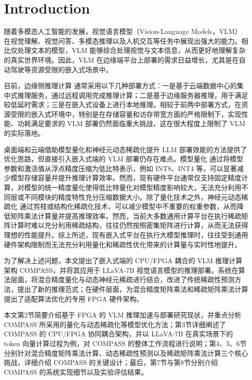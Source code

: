 \documentclass[sigconf]{acmart}
\begin{document}
	\section{Introduction}
	随着多模态人工智能的发展，视觉语言模型（Vision-Language Models，VLM） \cite{VisualLargeLanguageModels} 在视觉理解、视觉问答、多模态推理以及人机交互等任务中展现出强大的能力。相比仅处理文本的模型，VLM 能够综合处理视觉与文本信息，从而更好地理解复杂的真实世界环境。因此，VLM 在边缘端平台上部署的需求日益增长，尤其是在自动驾驶等资源受限的嵌入式场景中。

	目前，边缘侧推理计算 \cite{EdgeComputing} 通常采用以下几种部署方式：一是基于云端数据中心的集中式推理服务，通过远程调用完成推理计算；二是基于边缘服务器推理，用于满足较低延时需求；三是在嵌入式设备上进行本地推理。相较于前两中部署方式，在资源受限的嵌入式环境中，特别是在存储容量和访存带宽方面的严格限制下，实现性能、功耗满足要求的 VLM 部署仍然面临重大挑战，这在很大程度上限制了 VLM 的实际落地。

	桌面端和云端借助模型量化和神经元动态稀疏化提升 LLM 部署效能的方法提供了优化思路，但直接引入嵌入式端的 VLM 部署仍存在难点。模型量化 \cite{MEViT} \cite{QVLM} \cite{Q-VLM} \cite{Swin} \cite{TrackVLA} 通过将模型参数和激活值从浮点精度压缩为低比特表示，例如 INT8、INT4 等，可以显著减少模型存储容量并提升推理计算效率。然而，现有硬件平台通常仅支持固定精度计算，对模型的统一精度量化使得低比特量化对模型精度影响较大，无法充分利用不同层或不同模块的精度特性充分压缩数据大小。除了量化技术之外，神经元动态稀疏化 \cite{DejaVu} \cite{Powerinfer} 通过剪枝或结构化稀疏化技术，可以减少模型中不重要的权重参数，从而降低矩阵乘法计算量并提高推理效率。然而，当前大多数通用计算平台在执行稀疏矩阵计算时难以充分利用稀疏结构，往往仍然按照密集矩阵进行计算，从而无法获得理想的性能提升。综上所述，现有嵌入式平台在执行大模型推理时，往往受到通用硬件架构限制而无法充分利用量化和稀疏性优化带来的计算量与实时性地提升。
	
	为了解决上述问题，本文提出了嵌入式端的 CPU/FPGA 耦合的 VLM 推理计算架构 COMPASS，并将其应用于 LLaVA-7B \cite{Q-VLM} 视觉语言模型的推理部署。系统在算法层面，将混合精度量化与动态神经元稀疏进行结合，改进了传统稀疏性预测方法，提出了新的推理范式；在硬件层面，为混合精度矩阵乘法和稀疏矩阵乘法计算提出了适配算法优化的专用 FPGA 硬件架构。
	
	本文第2节简要介绍基于 FPGA 的 VLM 推理加速与部署研究现状，并重点分析 COMPASS 所采用的量化与动态稀疏化等模型优化方法；第3节详细阐述了 COMPASS 的 CPU/FPGA 协同耦合架构，并以 LLaVA-7B 在真实场景下的 token 向量计算过程为例，对 COMPASS 的整体工作流程进行说明；第4、5、6节分别针对混合精度矩阵乘法计算、动态稀疏性预测以及稀疏矩阵乘法计算三个核心挑战，详细介绍 COMPASS 的关键设计；最后，第7节与第8节分别介绍 COMPASS 的系统实现细节以及实验评估结果。
	
\end{document}
